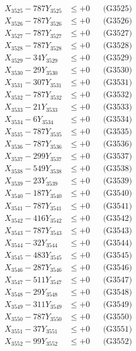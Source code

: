 \documentclass[a4paper,10pt]{article}
\begin{document}
{\begin{align}
X_{3525} - 787Y_{3525} &\leq +0 && \text{(G3525)} \\
X_{3526} - 787Y_{3526} &\leq +0 && \text{(G3526)} \\
X_{3527} - 787Y_{3527} &\leq +0 && \text{(G3527)} \\
X_{3528} - 787Y_{3528} &\leq +0 && \text{(G3528)} \\
X_{3529} - 34Y_{3529} &\leq +0 && \text{(G3529)} \\
X_{3530} - 29Y_{3530} &\leq +0 && \text{(G3530)} \\
\allowbreak
X_{3531} - 307Y_{3531} &\leq +0 && \text{(G3531)} \\
X_{3532} - 787Y_{3532} &\leq +0 && \text{(G3532)} \\
X_{3533} - 21Y_{3533} &\leq +0 && \text{(G3533)} \\
X_{3534} - 6Y_{3534} &\leq +0 && \text{(G3534)} \\
X_{3535} - 787Y_{3535} &\leq +0 && \text{(G3535)} \\
X_{3536} - 787Y_{3536} &\leq +0 && \text{(G3536)} \\
X_{3537} - 299Y_{3537} &\leq +0 && \text{(G3537)} \\
X_{3538} - 549Y_{3538} &\leq +0 && \text{(G3538)} \\
X_{3539} - 23Y_{3539} &\leq +0 && \text{(G3539)} \\
X_{3540} - 187Y_{3540} &\leq +0 && \text{(G3540)} \\
\allowbreak
X_{3541} - 787Y_{3541} &\leq +0 && \text{(G3541)} \\
X_{3542} - 416Y_{3542} &\leq +0 && \text{(G3542)} \\
X_{3543} - 787Y_{3543} &\leq +0 && \text{(G3543)} \\
X_{3544} - 32Y_{3544} &\leq +0 && \text{(G3544)} \\
X_{3545} - 483Y_{3545} &\leq +0 && \text{(G3545)} \\
X_{3546} - 287Y_{3546} &\leq +0 && \text{(G3546)} \\
X_{3547} - 511Y_{3547} &\leq +0 && \text{(G3547)} \\
X_{3548} - 29Y_{3548} &\leq +0 && \text{(G3548)} \\
X_{3549} - 311Y_{3549} &\leq +0 && \text{(G3549)} \\
X_{3550} - 787Y_{3550} &\leq +0 && \text{(G3550)} \\
\allowbreak
X_{3551} - 37Y_{3551} &\leq +0 && \text{(G3551)} \\
X_{3552} - 99Y_{3552} &\leq +0 && \text{(G3552)} \\

\end{align}}
\end{document}
